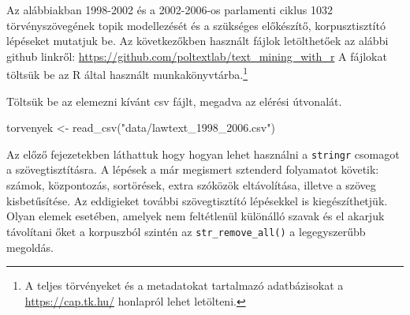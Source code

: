 \documentclass[
]{book}
\newenvironment{Shaded}{\begin{snugshade}}{\end{snugshade}}
\newcommand{\FunctionTok}[1]{\textcolor[rgb]{0.00,0.00,0.00}{#1}}
\newcommand{\NormalTok}[1]{#1}
\newcommand{\OtherTok}[1]{\textcolor[rgb]{0.56,0.35,0.01}{#1}}
\newcommand{\StringTok}[1]{\textcolor[rgb]{0.31,0.60,0.02}{#1}}
\begin{document}
Az alábbiakban 1998-2002 és a 2002-2006-os parlamenti ciklus 1032
törvényszövegének topik modellezését és a szükséges előkészítő,
korpusztisztító lépéseket mutatjuk be. Az következőkben használt fájlok
letölthetőek az alábbi github linkről:
\url{https://github.com/poltextlab/text_mining_with_r} A fájlokat
töltsük be az R által használt munkakönyvtárba.\footnote{A teljes
  törvényeket és a metadatokat tartalmazó adatbázisokat a
  \url{https://cap.tk.hu/} honlapról lehet letölteni.}

Töltsük be az elemezni kívánt csv fájlt, megadva az elérési útvonalát.

\begin{Shaded}
\begin{Highlighting}[]
\NormalTok{torvenyek }\OtherTok{\textless{}{-}} \FunctionTok{read\_csv}\NormalTok{(}\StringTok{"data/lawtext\_1998\_2006.csv"}\NormalTok{)}
\end{Highlighting}
\end{Shaded}

Az előző fejezetekben láthattuk hogy hogyan lehet használni a
\texttt{stringr} csomagot a szövegtisztításra. A lépések a már megismert
sztenderd folyamatot követik: számok, központozás, sortörések, extra
szóközök eltávolítása, illetve a szöveg kisbetűsítése. Az eddigieket
további szövegtisztító lépésekkel is kiegészíthetjük. Olyan elemek
esetében, amelyek nem feltétlenül különálló szavak és el akarjuk
távolítani őket a korpuszból szintén az \texttt{str\_remove\_all()} a
legegyszerűbb megoldás.
\end{document}
